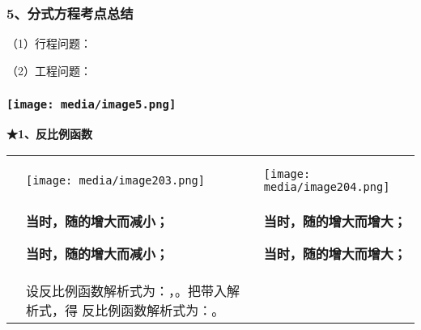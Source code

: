 \documentclass[a4paper,11pt,UTF8]{ctexart}
\begin{document}
\hypertarget{ux5206ux5f0fux65b9ux7a0bux8003ux70b9ux603bux7ed3}{%
\subsubsection{\texorpdfstring{\textbf{5、分式方程考点总结}}{5、分式方程考点总结}}\label{ux5206ux5f0fux65b9ux7a0bux8003ux70b9ux603bux7ed3}}

（1）行程问题：

（2）工程问题：

\hypertarget{ux5b66ux79d1ux7f51www.zxxk.com--ux6559ux80b2ux8d44ux6e90ux95e8ux6237ux63d0ux4f9bux8bd5ux9898ux8bd5ux5377ux6559ux6848ux8bfeux4ef6ux6559ux5b66ux8bbaux6587ux7d20ux6750ux7b49ux5404ux7c7bux6559ux5b66ux8d44ux6e90ux5e93ux4e0bux8f7dux8fd8ux6709ux5927ux91cfux4e30ux5bccux7684ux6559ux5b66ux8d44ux8baf-37}{%
\subsubsection{\texorpdfstring{\protect\texttt{[image: media/image5.png]}}{学科网(www.zxxk.com)-\/-教育资源门户，提供试题试卷、教案、课件、教学论文、素材等各类教学资源库下载，还有大量丰富的教学资讯！}}\label{ux5b66ux79d1ux7f51www.zxxk.com--ux6559ux80b2ux8d44ux6e90ux95e8ux6237ux63d0ux4f9bux8bd5ux9898ux8bd5ux5377ux6559ux6848ux8bfeux4ef6ux6559ux5b66ux8bbaux6587ux7d20ux6750ux7b49ux5404ux7c7bux6559ux5b66ux8d44ux6e90ux5e93ux4e0bux8f7dux8fd8ux6709ux5927ux91cfux4e30ux5bccux7684ux6559ux5b66ux8d44ux8baf-37}}

\textbf{★1、反比例函数}

\begin{longtable}[]{@{}lll@{}}
\toprule
\endhead
& &\tabularnewline
& &\tabularnewline
& \texttt{[image: media/image203.png]} &
\texttt{[image: media/image204.png]}\tabularnewline
\begin{minipage}[t]{0.30\columnwidth}\raggedright
\strut
\end{minipage} & \begin{minipage}[t]{0.30\columnwidth}\raggedright
\textbf{当时，随的增大而减小；}

\textbf{当时，随的增大而减小；}\strut
\end{minipage} & \begin{minipage}[t]{0.30\columnwidth}\raggedright
\textbf{当时，随的增大而增大；}

\textbf{当时，随的增大而增大；}\strut
\end{minipage}\tabularnewline
& 设反比例函数解析式为：，。把带入解析式，得 反比例函数解析式为：。
&\tabularnewline
\bottomrule
\end{longtable}
\end{document}
